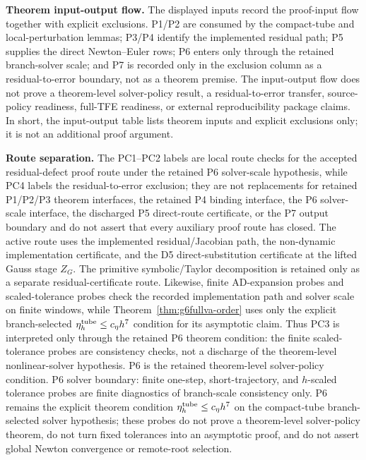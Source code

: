 \documentclass[preprint,12pt]{elsarticle}
\newcommand{\tfe}{TFE}
\begin{document}
\noindent\textbf{Theorem input-output flow.}
The displayed inputs record the proof-input flow
together with explicit exclusions. P1/P2
are consumed by the compact-tube and local-perturbation lemmas; P3/P4
identify the implemented residual path; P5 supplies the direct
Newton--Euler rows; P6 enters only through the retained branch-solver
scale; and P7 is recorded only in the exclusion column as a
residual-to-error boundary, not as a theorem premise. The
input-output flow does not prove a theorem-level solver-policy result,
a residual-to-error transfer, source-policy readiness, full-\tfe{} readiness,
or external reproducibility package claims.
In short, the input-output table lists theorem inputs and explicit exclusions only; it is not
an additional proof argument.

\noindent\textbf{Route separation.}
The PC1--PC2 labels are local route checks for the accepted residual-defect
proof route under the retained P6 solver-scale hypothesis, while PC4 labels
the residual-to-error exclusion; they are not replacements for
retained P1/P2/P3 theorem interfaces, the retained P4 binding interface, the
P6 solver-scale interface, the discharged P5 direct-route certificate, or the
P7 output boundary and do not assert that every
auxiliary proof route has closed.  The
active route uses the implemented residual/Jacobian path, the non-dynamic
implementation certificate, and the D5 direct-substitution certificate at the
lifted Gauss stage \(Z_G\).  The primitive symbolic/Taylor decomposition is
retained only as a separate residual-certificate route.  Likewise, finite
AD-expansion probes and scaled-tolerance probes check the recorded
implementation path and solver scale on finite windows, while
Theorem~\ref{thm:g6fullva-order} uses only the explicit branch-selected
\(\eta_h^{\rm tube}\le c_\eta h^7\) condition for its asymptotic claim.
Thus PC3 is interpreted only through the retained P6 theorem condition:
the finite scaled-tolerance probes are consistency checks, not a discharge of
the theorem-level nonlinear-solver hypothesis.
P6 is the retained theorem-level solver-policy condition.
P6 solver boundary: finite one-step, short-trajectory, and
\(h\)-scaled tolerance probes are finite diagnostics of branch-scale consistency only. P6
remains the explicit theorem condition
\(\eta_h^{\rm tube}\le c_\eta h^7\) on the compact-tube branch-selected
solver hypothesis; these probes do not prove a theorem-level solver-policy theorem, do not turn fixed tolerances into an asymptotic proof, and do not
assert global Newton convergence or remote-root selection.
\end{document}
